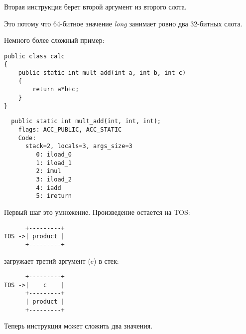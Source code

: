 Вторая инструкция  берет второй аргумент из второго слота.

Это потому что 64-битное значение \emph{long} занимает ровно два 32-битных слота.


Немного более сложный пример:

\begin{lstlisting}[style=customjava]
public class calc
{
	public static int mult_add(int a, int b, int c)
	{
		return a*b+c;
	}
}
\end{lstlisting}

\begin{lstlisting}
  public static int mult_add(int, int, int);
    flags: ACC_PUBLIC, ACC_STATIC
    Code:
      stack=2, locals=3, args_size=3
         0: iload_0       
         1: iload_1       
         2: imul          
         3: iload_2       
         4: iadd          
         5: ireturn       
\end{lstlisting}


Первый шаг это умножение. Произведение остается на \ac{TOS}:

\begin{lstlisting}
      +---------+
TOS ->| product |
      +---------+
\end{lstlisting}

 загружает третий аргумент (c) в стек:

\begin{lstlisting}
      +---------+
TOS ->|    c    |
      +---------+
      | product |
      +---------+
\end{lstlisting}


Теперь инструкция  может сложить два значения.
